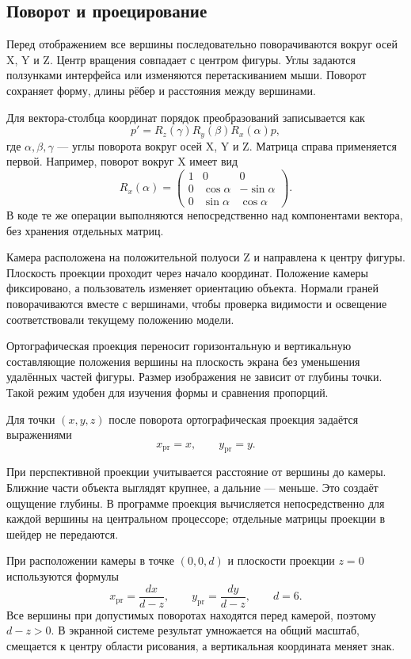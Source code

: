 \subsection{Поворот и проецирование}

Перед отображением все вершины последовательно поворачиваются вокруг осей X, Y и Z. Центр вращения совпадает с центром фигуры. Углы задаются ползунками интерфейса или изменяются перетаскиванием мыши. Поворот сохраняет форму, длины рёбер и расстояния между вершинами.

Для вектора-столбца координат порядок преобразований записывается как
\begin{equation}
  p'=R_z(\gamma)R_y(\beta)R_x(\alpha)p,
  \label{eq:rotation}
\end{equation}
где \(\alpha,\beta,\gamma\) — углы поворота вокруг осей X, Y и Z.
Матрица справа применяется первой. Например, поворот вокруг X имеет вид
\begin{equation}
  R_x(\alpha)=
  \begin{pmatrix}
    1 & 0 & 0 \\
    0 & \cos\alpha & -\sin\alpha \\
    0 & \sin\alpha & \cos\alpha
  \end{pmatrix}.
  \label{eq:rotation-x}
\end{equation}
В коде те же операции выполняются непосредственно над компонентами вектора,
без хранения отдельных матриц.

Камера расположена на положительной полуоси Z и направлена к центру фигуры. Плоскость проекции проходит через начало координат. Положение камеры фиксировано, а пользователь изменяет ориентацию объекта. Нормали граней поворачиваются вместе с вершинами, чтобы проверка видимости и освещение соответствовали текущему положению модели.

Ортографическая проекция переносит горизонтальную и вертикальную составляющие положения вершины на плоскость экрана без уменьшения удалённых частей фигуры. Размер изображения не зависит от глубины точки. Такой режим удобен для изучения формы и сравнения пропорций.

Для точки \((x,y,z)\) после поворота ортографическая проекция задаётся выражениями
\begin{equation}
  x_{\mathrm{pr}}=x, \qquad y_{\mathrm{pr}}=y.
  \label{eq:orthographic}
\end{equation}

При перспективной проекции учитывается расстояние от вершины до камеры. Ближние части объекта выглядят крупнее, а дальние — меньше. Это создаёт ощущение глубины. В программе проекция вычисляется непосредственно для каждой вершины на центральном процессоре; отдельные матрицы проекции в шейдер не передаются.

При расположении камеры в точке \((0,0,d)\) и плоскости проекции \(z=0\)
используются формулы
\begin{equation}
  x_{\mathrm{pr}}=\frac{dx}{d-z}, \qquad
  y_{\mathrm{pr}}=\frac{dy}{d-z}, \qquad d=6.
  \label{eq:perspective}
\end{equation}
Все вершины при допустимых поворотах находятся перед камерой, поэтому
\(d-z>0\). В экранной системе результат умножается на общий масштаб,
смещается к центру области рисования, а вертикальная координата меняет знак.
